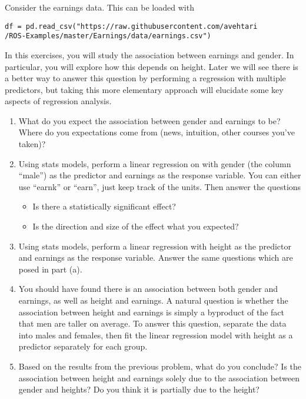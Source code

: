 \begin{exercise} Consider the earnings data. This can be loaded with 
\begin{Verbatim}
df = pd.read_csv("https://raw.githubusercontent.com/avehtari
/ROS-Examples/master/Earnings/data/earnings.csv")
\end{Verbatim}
In this exercises, you will study the association between earnings and gender. In particular, you will explore how this depends on height. Later we will see there is a better way to answer this question by performing a regression with multiple predictors, but taking this more elementary approach will elucidate some key aspects of regression analysis. 
\begin{enumerate}[label=(\alph*)]
\item What do you expect the association between gender and earnings to be? Where do you expectations come from (news, intuition, other courses you've taken)? 
\item Using stats models, perform a linear regression on with gender (the column ``male'') as the predictor and earnings as the response variable. You can either use ``earnk'' or ``earn'', just keep track of the units.  Then answer the questions 
\begin{itemize}
\item Is there a statistically significant effect? 
\item Is the direction and size of the effect what you expected? 
\end{itemize}
\item  Using stats models, perform a linear regression with height as the predictor and earnings as the response variable. Answer the same questions which are posed in part (a). 
\item You should have found there is an association between both gender and earnings, as well as height and earnings. 
 A natural question is whether the association between height and earnings is simply a byproduct of the fact that men are taller on average.  To answer this question, separate the data into males and females, then fit the linear regression model with height as a predictor separately for each group. 
 \item Based on the results from the previous problem, what do you conclude? Is the association between height and earnings solely due to the association between gender and heights? Do you think it is partially due to the height? 
\end{enumerate}
\end{exercise}

